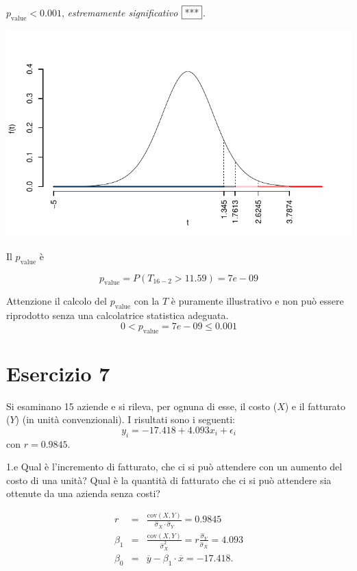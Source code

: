 \documentclass[
  11pt,
]{book}
\theoremstyle{mytheoremstyle}
\theoremstyle{mydefstyle}
\newenvironment{sol}
  {
  \begin{tcolorbox}[enhanced,breakable,arc=0.1mm,boxrule=1pt,colback=white,colframe=iblue,
  title=\bf \fontfamily{lmss}\selectfont \hspace{.5 cm} Soluzione,drop fuzzy shadow]

}{
\end{tcolorbox}
  }
\begin{document}
\begin{sol}
\(p_\text{value}<0.001\), \emph{estremamente significativo} \(\fbox{***}\).

\begin{center}\includegraphics{Esami_passati_con_soluzioni_files/figure-latex/06-regr-37,-1} \end{center}

Il \(p_{\text{value}}\) è

\[ p_{\text{value}} = P(T_{16-2}>11.59)=7e-09 \]

Attenzione il calcolo del \(p_\text{value}\) con la \(T\) è puramente illustrativo e non può essere riprodotto senza una calcolatrice statistica adeguata.\[
 0 < p_\text{value}= 7e-09 \leq 0.001 
\]

\end{sol}

\section{Esercizio 7}\label{esercizio-7}

Si esaminano 15 aziende e si rileva, per ognuna di esse, il
costo (\(X\)) e il fatturato (\(Y\)) (in unità convenzionali).
I risultati sono i seguenti:
\[y_{i} = -17.418 + 4.093 x_{i} + \epsilon_{i}\]
con \(r=0.9845\).

1.e Qual è l'incremento di fatturato, che
ci si può attendere con un aumento del costo di una unità?
Qual è la quantità di fatturato che ci si può attendere sia
ottenute da una azienda senza costi?

\begin{sol}
\begin{eqnarray*}
r         &=& \frac{\text{cov}(X,Y)} {\hat\sigma_X\cdot\hat\sigma_Y} = 0.9845 \\
\beta_{1} &=& \frac{\text{cov}(X,Y)} {\hat\sigma_X^{2}}
           =  r \frac{\hat\sigma_Y} {\hat\sigma_X} = 4.093         \\
\beta_{0} &=& \overline{y} - \beta_{1} \cdot \overline{x} = -17.418.
\end{eqnarray*}

\end{sol}
\end{document}
